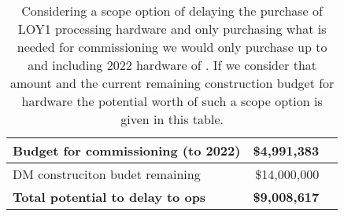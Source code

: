 \tiny \begin{longtable} { |p{}  |r  |r |} 
\caption{Considering a scope option of delaying the purchase of LOY1 processing hardware and only purchasing what is needed for commissioning we would only purchase up to and including 2022 hardware of . If we consider that amount and the current remaining construction budget for hardware the potential worth of such a scope option is given in this table. \label{tab:Scope}}\\ 
\hline 
\textbf{Budget for commissioning (to 2022)}&\textbf{\$4,991,383} \\ \hline
{DM construciton budet remaining}&{\$14,000,000} \\ \hline
\textbf{Total potential to delay to ops }&\textbf{\$9,008,617} \\ \hline
\end{longtable} \normalsize
